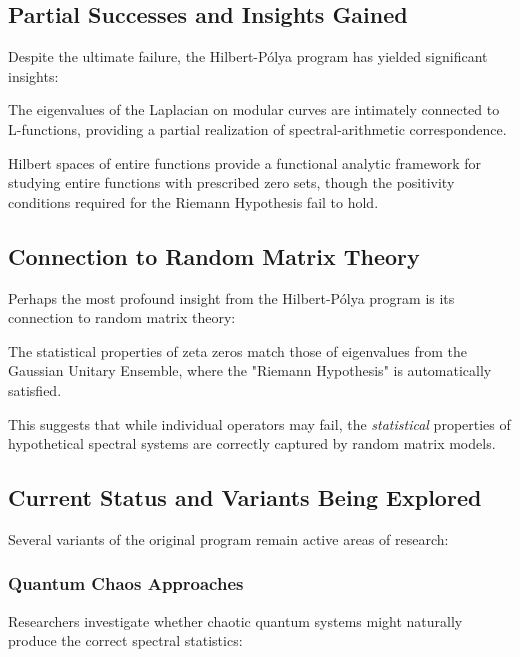 \subsection{Partial Successes and Insights Gained}

Despite the ultimate failure, the Hilbert-Pólya program has yielded significant insights:

\begin{theorem}
\label{thm:automorphic_connections}
The eigenvalues of the Laplacian on modular curves are intimately connected to L-functions, providing a partial realization of spectral-arithmetic correspondence.
\end{theorem}

\begin{theorem}
\label{thm:de_branges_theory}
Hilbert spaces of entire functions provide a functional analytic framework for studying entire functions with prescribed zero sets, though the positivity conditions required for the Riemann Hypothesis fail to hold.
\end{theorem}

\subsection{Connection to Random Matrix Theory}

Perhaps the most profound insight from the Hilbert-Pólya program is its connection to random matrix theory:

\begin{theorem}
\label{thm:statistical_correspondence}
The statistical properties of zeta zeros match those of eigenvalues from the Gaussian Unitary Ensemble, where the "Riemann Hypothesis" is automatically satisfied.
\end{theorem}

This suggests that while individual operators may fail, the \emph{statistical} properties of hypothetical spectral systems are correctly captured by random matrix models.

\subsection{Current Status and Variants Being Explored}

Several variants of the original program remain active areas of research:

\subsubsection{Quantum Chaos Approaches}
Researchers investigate whether chaotic quantum systems might naturally produce the correct spectral statistics:

